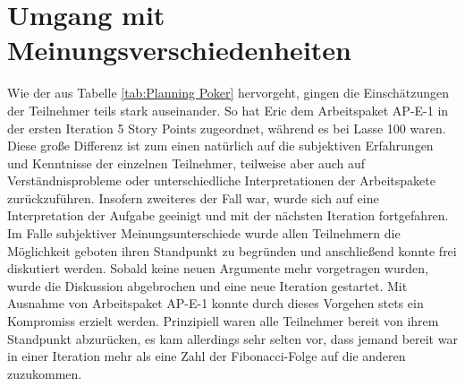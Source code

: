 \section{Umgang mit Meinungsverschiedenheiten}

Wie der aus Tabelle \ref{tab:Planning Poker} hervorgeht, gingen die Einschätzungen der Teilnehmer teils stark auseinander. So hat Eric dem Arbeitspaket AP-E-1 in der ersten Iteration 5 Story Points zugeordnet, während es bei Lasse 100 waren. Diese große Differenz ist zum einen natürlich auf die subjektiven Erfahrungen und Kenntnisse der einzelnen Teilnehmer, teilweise aber auch auf Verständnisprobleme oder unterschiedliche Interpretationen der Arbeitspakete zurückzuführen. Insofern zweiteres der Fall war, wurde sich auf eine Interpretation der Aufgabe geeinigt und mit der nächsten Iteration fortgefahren. Im Falle subjektiver Meinungsunterschiede wurde allen Teilnehmern die Möglichkeit geboten ihren Standpunkt zu begründen und anschließend konnte frei diskutiert werden. Sobald keine neuen Argumente mehr vorgetragen wurden, wurde die Diskussion abgebrochen und eine neue Iteration gestartet. Mit Ausnahme von Arbeitspaket AP-E-1 konnte durch dieses Vorgehen stets ein Kompromiss erzielt werden. Prinzipiell waren alle Teilnehmer bereit von ihrem Standpunkt abzurücken, es kam allerdings sehr selten vor, dass jemand bereit war in einer Iteration mehr als eine Zahl der Fibonacci-Folge auf die anderen zuzukommen.